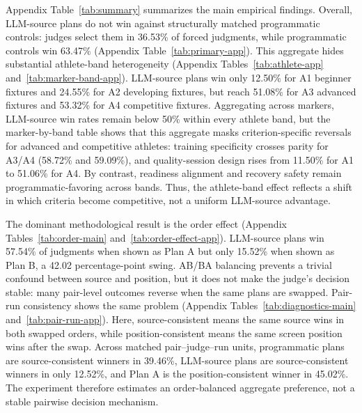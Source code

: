 \documentclass[11pt]{article}
\begin{document}
Appendix Table~\ref{tab:summary} summarizes the main empirical findings. Overall, LLM-source plans do not win against structurally matched programmatic controls: judges select them in 36.53\% of forced judgments, while programmatic controls win 63.47\% (Appendix Table~\ref{tab:primary-app}). This aggregate hides substantial athlete-band heterogeneity (Appendix Tables~\ref{tab:athlete-app} and~\ref{tab:marker-band-app}). LLM-source plans win only 12.50\% for A1 beginner fixtures and 24.55\% for A2 developing fixtures, but reach 51.08\% for A3 advanced fixtures and 53.32\% for A4 competitive fixtures. Aggregating across markers, LLM-source win rates remain below 50\% within every athlete band, but the marker-by-band table shows that this aggregate masks criterion-specific reversals for advanced and competitive athletes: training specificity crosses parity for A3/A4 (58.72\% and 59.09\%), and quality-session design rises from 11.50\% for A1 to 51.06\% for A4. By contrast, readiness alignment and recovery safety remain programmatic-favoring across bands. Thus, the athlete-band effect reflects a shift in which criteria become competitive, not a uniform LLM-source advantage.

The dominant methodological result is the order effect (Appendix Tables~\ref{tab:order-main} and~\ref{tab:order-effect-app}). LLM-source plans win 57.54\% of judgments when shown as Plan A but only 15.52\% when shown as Plan B, a 42.02 percentage-point swing. AB/BA balancing prevents a trivial confound between source and position, but it does not make the judge's decision stable: many pair-level outcomes reverse when the same plans are swapped. Pair-run consistency shows the same problem (Appendix Tables~\ref{tab:diagnostics-main} and~\ref{tab:pair-run-app}). Here, source-consistent means the same source wins in both swapped orders, while position-consistent means the same screen position wins after the swap. Across matched pair--judge--run units, programmatic plans are source-consistent winners in 39.46\%, LLM-source plans are source-consistent winners in only 12.52\%, and Plan A is the position-consistent winner in 45.02\%. The experiment therefore estimates an order-balanced aggregate preference, not a stable pairwise decision mechanism.
\end{document}

